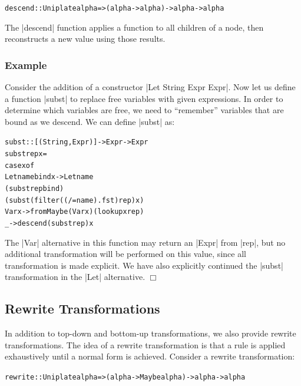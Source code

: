 \documentclass[preprint]{sigplanconf}
\newcounter{exmp}
\newcommand{\yesexample}{\subsubsection*{Example \arabic{exmp}}\refstepcounter{exmp}}
\newcommand{\noexample}{\hfill$\Box$}
\newenvironment{code}{\begin{alltt}\small}{\end{alltt}}
\newenvironment{example}{\yesexample}{\noexample}
\newcommand{\ignore}{}
\begin{document}
\begin{code}
descend :: Uniplate alpha => (alpha -> alpha) -> alpha -> alpha
\end{code}

The |descend| function applies a function to all children of a node, then reconstructs a new value using those results.

\begin{example}
Consider the addition of a constructor \ignore|Let String Expr Expr|. Now let us define a function |subst| to replace free variables with given expressions. In order to determine which variables are free, we need to ``remember'' variables that are bound as we descend. We can define |subst| as:

\begin{code}
subst :: [(String,Expr)] -> Expr -> Expr
subst rep x =
    case  x of
          Let name bind x -> Let name
              (subst rep bind)
              (subst (filter ((/= name) . fst) rep) x)
          Var x -> fromMaybe (Var x) (lookup x rep)
          _ -> descend (subst rep) x
\end{code}

The |Var| alternative in this function may return an |Expr| from |rep|, but no additional transformation will be performed on this value, since all transformation is made explicit. We have also explicitly continued the |subst| transformation in the |Let| alternative.
\end{example}

\subsection{Rewrite Transformations}

In addition to top-down and bottom-up transformations, we also provide rewrite transformations. The idea of a rewrite transformation is that a rule is applied exhaustively until a normal form is achieved. Consider a rewrite transformation:

\begin{code}
rewrite :: Uniplate alpha => (alpha -> Maybe alpha) -> alpha -> alpha
\end{code}
\end{document}
